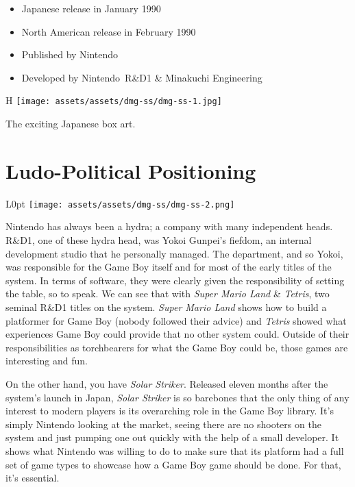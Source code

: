 \documentclass{book}
\begin{document}
\begin{itemize} \setlength\itemsep{-0.4em}
\item Japanese release in January 1990
\item North American release in February 1990
\item Published by Nintendo
\item Developed by Nintendo R\&D1 \& Minakuchi Engineering
\end{itemize}\noindent

\begin{wrapfigure}{H}{\linewidth}
\vskip 4pt
\centering \texttt{[image: assets/assets/dmg-ss/dmg-ss-1.jpg]}\par\pagetwodescription The exciting Japanese box art.\end{wrapfigure}
\clearpage

\FloatBarrier\needspace{5pt}\section*{Ludo-Political Positioning}\nopagebreak[4]

\begin{wrapfigure}{L}{0pt} \texttt{[image: assets/assets/dmg-ss/dmg-ss-2.png]}\end{wrapfigure}
Nintendo has always been a hydra; a company with many independent heads. R\&D1, one of these hydra head, was Yokoi Gunpei’s fiefdom, an internal development studio that he personally managed. The department, and so Yokoi, was responsible for the Game Boy itself and for most of the early titles of the system. In terms of software, they were clearly given the responsibility of setting the table, so to speak. We can see that with \emph{Super Mario Land} \& \emph{Tetris}, two seminal R\&D1 titles on the system. \emph{Super Mario Land} shows how to build a platformer for Game Boy (nobody followed their advice) and \emph{Tetris} showed what experiences Game Boy could provide that no other system could. Outside of their responsibilities as torchbearers for what the Game Boy could be, those games are interesting and fun.

On the other hand, you have \emph{Solar Striker}. Released eleven months after the system’s launch in Japan, \emph{Solar Striker} is so barebones that the only thing of any interest to modern players is its overarching role in the Game Boy library. It’s simply Nintendo looking at the market, seeing there are no shooters on the system and just pumping one out quickly with the help of a small developer. It shows what Nintendo was willing to do to make sure that its platform had a full set of game types to showcase how a Game Boy game should be done. For that, it’s essential.
\end{document}
